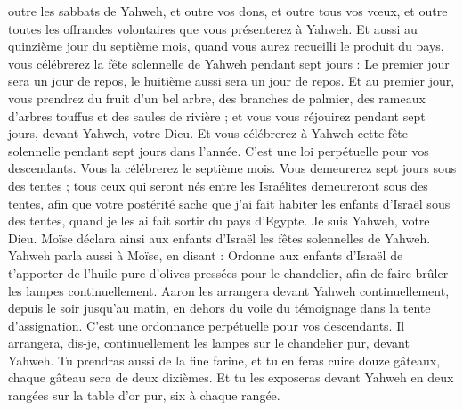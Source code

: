 \begin{multicols}{2}
outre les sabbats de Yahweh, et outre vos dons, et outre tous vos vœux, et outre toutes les offrandes volontaires que vous présenterez à Yahweh.
Et aussi au quinzième jour du septième mois, quand vous aurez recueilli le produit du pays, vous célébrerez la fête solennelle de Yahweh pendant sept jours : Le premier jour sera un jour de repos, le huitième aussi sera un jour de repos.
Et au premier jour, vous prendrez du fruit d'un bel arbre, des branches de palmier, des rameaux d'arbres touffus et des saules de rivière ; et vous vous réjouirez pendant sept jours, devant Yahweh, votre Dieu.
Et vous célébrerez à Yahweh cette fête solennelle pendant sept jours dans l'année. C'est une loi perpétuelle pour vos descendants. Vous la célébrerez le septième mois.
Vous demeurerez sept jours sous des tentes ; tous ceux qui seront nés entre les Israélites demeureront sous des tentes,
afin que votre postérité sache que j'ai fait habiter les enfants d'Israël sous des tentes, quand je les ai fait sortir du pays d'Egypte. Je suis Yahweh, votre Dieu.
Moïse déclara ainsi aux enfants d'Israël les fêtes solennelles de Yahweh.
\VerseOne{}Yahweh parla aussi à Moïse, en disant :
Ordonne aux enfants d'Israël de t'apporter de l'huile pure d'olives pressées pour le chandelier, afin de faire brûler les lampes continuellement.
Aaron les arrangera devant Yahweh continuellement, depuis le soir jusqu'au matin, en dehors du voile du témoignage dans la tente d'assignation. C'est une ordonnance perpétuelle pour vos descendants.
Il arrangera, dis-je, continuellement les lampes sur le chandelier pur, devant Yahweh.
Tu prendras aussi de la fine farine, et tu en feras cuire douze gâteaux, chaque gâteau sera de deux dixièmes.
Et tu les exposeras devant Yahweh en deux rangées sur la table d'or pur, six à chaque rangée.

\end{multicols}
